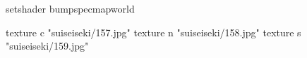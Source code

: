 setshader bumpspecmapworld

    texture c "suiseiseki/157.jpg"
    texture n "suiseiseki/158.jpg"
    texture s "suiseiseki/159.jpg"
